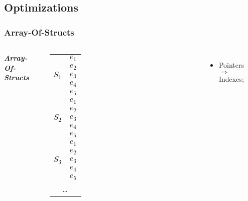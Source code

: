 \subsection{Optimizations}
\begin{frame}
	\frametitle{Array-Of-Structs}
	\begin{columns}
		\smaller
			\centering
			\textbf{\itshape Array-Of-Structs}

			\smaller
			\begin{tabular}{|c|c|}
				\hline
				\multirow{5}{*}{$S_{1}$} & $e_{1}$\\
				\cline{2-2}
				& $e_{2}$\\
				\cline{2-2}
				& $e_{3}$\\
				\cline{2-2}
				& $e_{4}$\\
				\cline{2-2}
				& $e_{5}$\\
				\hline
				\multirow{5}{*}{$S_{2}$} & $e_{1}$\\
				\cline{2-2}
				& $e_{2}$\\
				\cline{2-2}
				& $e_{3}$\\
				\cline{2-2}
				& $e_{4}$\\
				\cline{2-2}
				& $e_{5}$\\
				\hline
				\multirow{5}{*}{$S_{3}$} & $e_{1}$\\
				\cline{2-2}
				& $e_{2}$\\
				\cline{2-2}
				& $e_{3}$\\
				\cline{2-2}
				& $e_{4}$\\
				\cline{2-2}
				& $e_{5}$\\
				\hline
				\multicolumn{2}{|c|}{\ldots}
			\end{tabular}
			\larger

			\begin{itemize}
				\item Pointers $\Rightarrow$ Indexes;
			\end{itemize}


\end{columns}
\end{frame}
